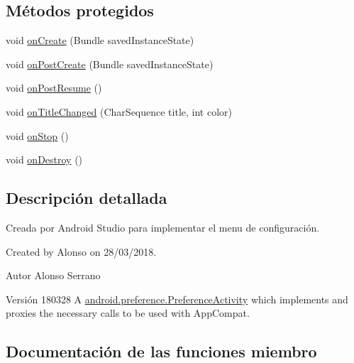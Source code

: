 \subsection*{Métodos protegidos}
\begin{DoxyCompactItemize}
\item 
void \mbox{\hyperlink{classcom_1_1loalon_1_1pfg_1_1facepal_1_1_app_compat_preference_activity_a4a7f2389e0796a1f1e758757b7ab99da}{on\+Create}} (Bundle saved\+Instance\+State)
\item 
void \mbox{\hyperlink{classcom_1_1loalon_1_1pfg_1_1facepal_1_1_app_compat_preference_activity_a89836ac30390948fe965d78d01530e77}{on\+Post\+Create}} (Bundle saved\+Instance\+State)
\item 
void \mbox{\hyperlink{classcom_1_1loalon_1_1pfg_1_1facepal_1_1_app_compat_preference_activity_a61539bdd250137ec5e3ff7a4dfee921a}{on\+Post\+Resume}} ()
\item 
void \mbox{\hyperlink{classcom_1_1loalon_1_1pfg_1_1facepal_1_1_app_compat_preference_activity_a3c4ede4b0fa997103ae6dc74ada97383}{on\+Title\+Changed}} (Char\+Sequence title, int color)
\item 
void \mbox{\hyperlink{classcom_1_1loalon_1_1pfg_1_1facepal_1_1_app_compat_preference_activity_a2da7c9998f2e5ba7ba7095a6060fbdb3}{on\+Stop}} ()
\item 
void \mbox{\hyperlink{classcom_1_1loalon_1_1pfg_1_1facepal_1_1_app_compat_preference_activity_ac91436db18f3546edc83d2933bc3a3af}{on\+Destroy}} ()
\end{DoxyCompactItemize}


\subsection{Descripción detallada}
Creada por Android Studio para implementar el menu de configuración. 

Created by Alonso on 28/03/2018. \begin{DoxyAuthor}{Autor}
Alonso Serrano 
\end{DoxyAuthor}
\begin{DoxyVersion}{Versión}
180328 A \mbox{\hyperlink{}{android.\+preference.\+Preference\+Activity}} which implements and proxies the necessary calls to be used with App\+Compat. 
\end{DoxyVersion}


\subsection{Documentación de las funciones miembro}
\mbox{\label{classcom_1_1loalon_1_1pfg_1_1facepal_1_1_app_compat_preference_activity_ac0e4a7ebdb9b70dfc44bf734abcf5039}} 

